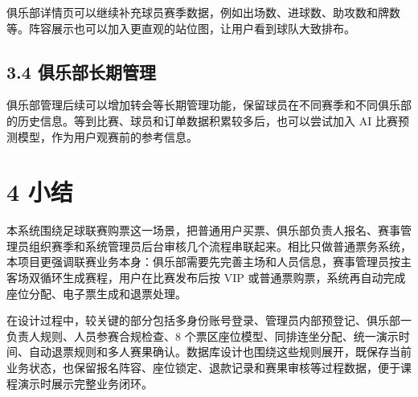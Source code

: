 \documentclass[UTF8,zihao=-4,a4paper]{ctexart}
\begin{document}
俱乐部详情页可以继续补充球员赛季数据，例如出场数、进球数、助攻数和牌数等。阵容展示也可以加入更直观的站位图，让用户看到球队大致排布。

\subsection*{3.4 俱乐部长期管理}
{}

俱乐部管理后续可以增加转会等长期管理功能，保留球员在不同赛季和不同俱乐部的历史信息。等到比赛、球员和订单数据积累较多后，也可以尝试加入 AI 比赛预测模型，作为用户观赛前的参考信息。

\section*{4 小结}
{}

本系统围绕足球联赛购票这一场景，把普通用户买票、俱乐部负责人报名、赛事管理员组织赛季和系统管理员后台审核几个流程串联起来。相比只做普通票务系统，本项目更强调联赛业务本身：俱乐部需要先完善主场和人员信息，赛事管理员按主客场双循环生成赛程，用户在比赛发布后按 VIP 或普通票购票，系统再自动完成座位分配、电子票生成和退票处理。

在设计过程中，较关键的部分包括多身份账号登录、管理员内部预登记、俱乐部一负责人规则、人员参赛合规检查、8 个票区座位模型、同排连坐分配、统一演示时间、自动退票规则和多人赛果确认。数据库设计也围绕这些规则展开，既保存当前业务状态，也保留报名阵容、座位锁定、退款记录和赛果审核等过程数据，便于课程演示时展示完整业务闭环。
\end{document}

